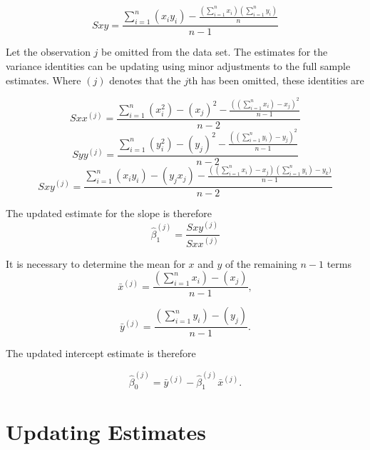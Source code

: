 \documentclass[12pt, a4paper]{article}
\begin{document}
\begin{equation}
Sxy=\frac{\sum_{i=1}^{n}(x_{i}y_{i})-\frac{(\sum_{i=1}^{n}x_{i})(\sum_{i=1}^{n}y_{i})}{n}}{n-1}
\end{equation}

Let the observation $j$ be omitted from the data set. The estimates for the variance identities can be updating using minor adjustments to the full sample estimates. Where $(j)$ denotes that the $j$th has been omitted, these identities are

\begin{equation}
Sxx^{(j)}=\frac{\sum_{i=1}^{n}(x_{i}^{2})-(x_{j})^{2}-\frac{((\sum_{i=1}^{n}x_{i})-x_{j})^{2}}{n-1}}{n-2}
\end{equation}
\begin{equation}
Syy^{(j)}=\frac{\sum_{i=1}^{n}(y_{i}^{2})-(y_{j})^{2}-\frac{((\sum_{i=1}^{n}y_{i})-y_{j})^{2}}{n-1}}{n-2}
\end{equation}
\begin{equation}
Sxy^{(j)}=\frac{\sum_{i=1}^{n}(x_{i}y_{i})-(y_{j}x_{j})-\frac{((\sum_{i=1}^{n}x_{i})-x_{j})(\sum_{i=1}^{n}y_{i})-y_{k})}{n-1}}{n-2}
\end{equation}

The updated estimate for the slope is therefore
\begin{equation}
\hat{\beta}_{1}^{(j)}=\frac{Sxy^{(j)}}{Sxx^{(j)}}
\end{equation}

It is necessary to determine the mean for $x$ and $y$ of the
remaining $n-1$ terms
\begin{equation}
\bar{x}^{(j)}=\frac{(\sum_{i=1}^{n}x_{i})-(x_{j})}{n-1},
\end{equation}

\begin{equation}
\bar{y}^{(j)}=\frac{(\sum_{i=1}^{n}y_{i})-(y_{j})}{n-1}.
\end{equation}

The updated intercept estimate is therefore

\begin{equation}
\hat{\beta}_{0}^{(j)}=\bar{y}^{(j)}-\hat{\beta}_{1}^{(j)}\bar{x}^{(j)}.
\end{equation}

\newpage
\section{Updating Estimates} %
\end{document}
